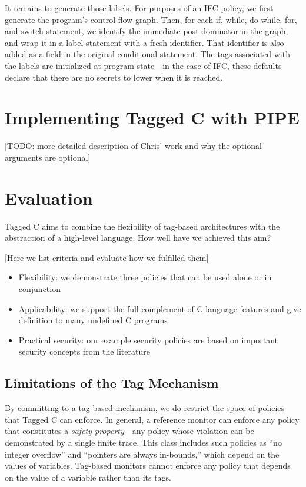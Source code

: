 \documentclass{llncs}
\begin{document}
It remains to generate those labels. For purposes of an IFC policy, we first generate the program's
control flow graph. Then, for each if, while, do-while, for, and switch statement, we identify the
immediate post-dominator in the graph, and wrap it in a label statement with a fresh identifier.
That identifier is also added as a field in the original conditional statement. The tags
associated with the labels are initialized at program state---in the case of IFC, these defaults
declare that there are no secrets to lower when it is reached.

\section{Implementing Tagged C with PIPE}

[TODO: more detailed description of Chris' work and why the optional arguments are optional]

\section{Evaluation}
\label{sec:evaluation}

Tagged C aims to combine the flexibility of tag-based architectures with the abstraction
of a high-level language. How well have we achieved this aim?

[Here we list criteria and evaluate how we fulfilled them]

\begin{itemize}
\item Flexibility: we demonstrate three policies that can be used alone or in conjunction
\item Applicability: we support the full complement of C language features and give definition
  to many undefined C programs
\item Practical security: our example security policies are based on important security concepts
  from the literature
\end{itemize}

\subsection{Limitations of the Tag Mechanism}

By committing to a tag-based mechanism, we do restrict the space of policies that Tagged C
can enforce. In general, a reference monitor can enforce any policy that constitutes a
{\em safety property}---any policy whose violation can be demonstrated by a single finite
trace. This class includes such policies as ``no integer overflow'' and ``pointers are always in-bounds,''
which depend on the values of variables. Tag-based monitors cannot enforce any policy that
depends on the value of a variable rather than its tags.
\end{document}

